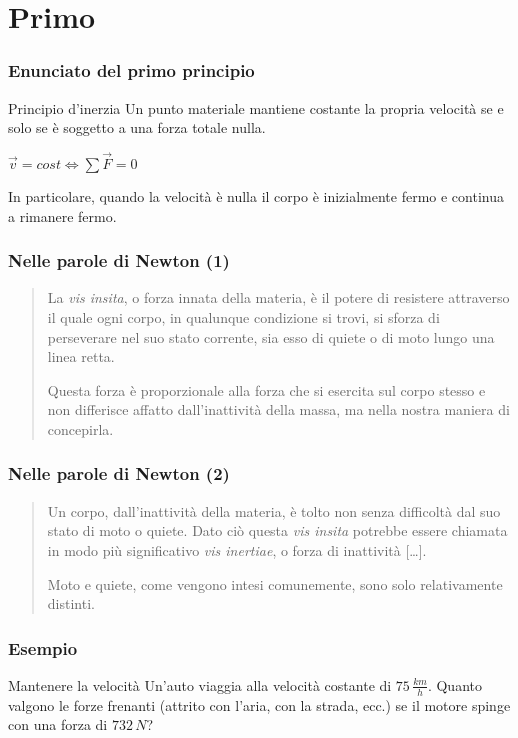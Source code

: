 \documentclass[]{beamer}
\theoremstyle{plain}
\begin{document}
\section{Primo}




\begin{frame}
  \frametitle{Enunciato del primo principio}
\begin{block}{Principio d'inerzia}
Un punto materiale mantiene costante la propria velocità se e solo se è soggetto a una forza totale nulla.
\begin{center}
\colorbox{blue!30}{$ \vec{v} = cost \Longleftrightarrow \sum \vec{F} = 0 $}\pause
\end{center}
In particolare, quando la velocità è nulla il corpo è inizialmente fermo e continua a rimanere fermo.
\end{block}
\end{frame}

\begin{frame}
  \frametitle{Nelle parole di Newton (1)}
  \begin{quote}
    La \emph{vis insita}, o forza innata della materia, è il potere di resistere attraverso il quale ogni corpo, in qualunque condizione si trovi, si sforza di \alert<1>{perseverare nel suo stato corrente},{\pause} sia esso di \alert<2>{quiete} o di \alert<2>{moto lungo una linea retta}.{\pause}
    
    Questa forza è \alert<3>{proporzionale alla forza che si esercita sul corpo stesso} e non differisce affatto dall'inattività della massa, ma nella nostra maniera di concepirla.
  \end{quote}
\end{frame}


\begin{frame}
  \frametitle{Nelle parole di Newton (2)}
  \begin{quote}
    Un corpo, dall'inattività della materia, è tolto non senza difficoltà dal suo stato di moto o quiete. Dato ciò questa \emph{vis insita} potrebbe essere chiamata in modo più significativo \emph{vis inertiae}, o forza di inattività [\ldots].{\pause}
    
    \alert<2>{Moto e quiete, come vengono intesi comunemente, sono solo relativamente distinti.}
  \end{quote}
\end{frame}

\begin{frame}
\frametitle{Esempio}
\begin{exampleblock}{Mantenere la velocità}
{\small Un'auto viaggia alla velocità costante di $ 75 \, \frac{km}{h} $. Quanto valgono le forze frenanti (attrito con l'aria, con la strada, ecc.) se il motore spinge con una forza di $ 732 \, N $?}
\end{exampleblock}
\end{frame}
\end{document}
